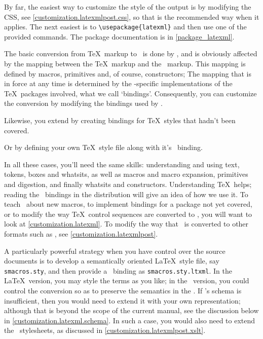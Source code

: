 \documentclass{book}
\begin{document}
By far, the easiest way to customize the style of the output is by modifying the CSS,
see \ref{customization.latexmlpost.css}, so that is the recommended way
when it applies.
The next easiest is to \verb|\usepackage{latexml}| and then use one of the provided commands.  The package documentation is in \ref{package_latexml}.

The basic conversion from \TeX\ markup to \XML\ is done by
, and is obviously affected by the mapping between the \TeX\ markup
and the \XML\ markup.  This mapping is defined by macros, primitives and, of course,
constructors;  The mapping that is in force at any time is determined by the
\LaTeXML-specific implementations of the \TeX\ packages involved, what we call `bindings'.
Consequently, you can customize the conversion by modifying the
bindings used by .

Likewise, you extend  by creating bindings for
\TeX\ styles that hadn't been covered.

Or by defining your own \TeX\ style file along with it's \LaTeXML\ binding.

In all these cases, you'll need the same skills: understanding and using
text, tokens, boxes and whatsits, as well as macros and macro expansion,
primitives and digestion, and finally whatsits and constructors.
Understanding \TeX\ helps; reading the \LaTeXML\ bindings in the distribution
will give an idea of how we use it.
To teach \LaTeXML\ about new macros, to implement bindings for a
package not yet covered, or to modify the way \TeX\ control sequences
are converted to \XML, you will want to look at \ref{customization.latexml}.
To modify the way that \XML\ is converted to other formats such as \HTML,
see \ref{customization.latexmlpost}.

A particularly powerful strategy when you have control over the
source documents is to develop a semantically oriented \LaTeX\ style file,
say \texttt{smacros.sty}, and then provide a \LaTeXML\ binding
as \texttt{smacros.sty.ltxml}. In the \LaTeX\ version, you may style
the terms as you like; in the \LaTeXML\ version, you could control
the conversion so as to preserve the semantics in the \XML.
If \LaTeXML's schema is insufficient, then you would need to extend it
with your own representation; although that is beyond the scope of
the current manual, see the discussion below in \ref{customization.latexml.schema}.
In such a case, you would also need to extend the \XSLT\ stylesheets,
as discussed in \ref{customization.latexmlpost.xslt}.
\end{document}
